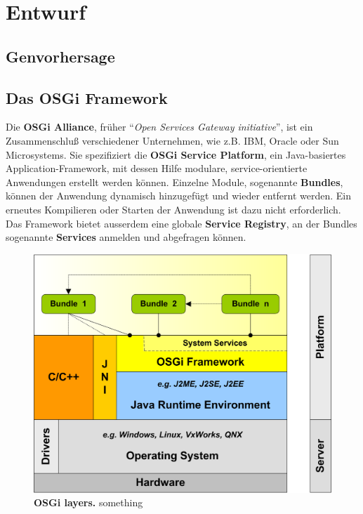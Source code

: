 \chapter{Entwurf}
\section{Genvorhersage}
\section{Das OSGi Framework}
Die \textbf{OSGi Alliance}, früher
\enquote{\textit{Open Services Gateway initiative}}, ist ein Zusammenschluß
verschiedener Unternehmen, wie z.B. IBM, Oracle oder Sun Microsystems.
Sie spezifiziert die \textbf{OSGi Service Platform}, ein Java-basiertes
Application-Framework, mit dessen Hilfe modulare, service-orientierte
Anwendungen erstellt werden können. Einzelne Module, sogenannte
\textbf{Bundles}, können der Anwendung dynamisch hinzugefügt und wieder
entfernt werden. Ein erneutes Kompilieren oder Starten der Anwendung ist dazu
nicht erforderlich.
Das Framework bietet ausserdem eine globale \textbf{Service Registry}, an der
Bundles sogenannte \textbf{Services} anmelden und abgefragen können.
\citep{wtherich_die_2008}
\begin{figure}[p]
	\begin{center}
		\includegraphics[scale=2]{pics/osgi_layer.png}
	\caption[OSGi layers]{
	\textbf{OSGi layers.}
	something}
	\end{center}
	\label{fig:osgi_layer}
\end{figure}
